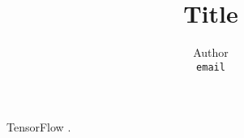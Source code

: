 \documentclass[a4paper,11pt]{article}
\title{Title}
\author{
  Author\\
  \texttt{email}
}
\date{}
\begin{document}
  \maketitle

  TensorFlow \citep{tf}.


  \setlength{}
  \renewcommand{\bibname}{Bibliography}
  
\end{document}

